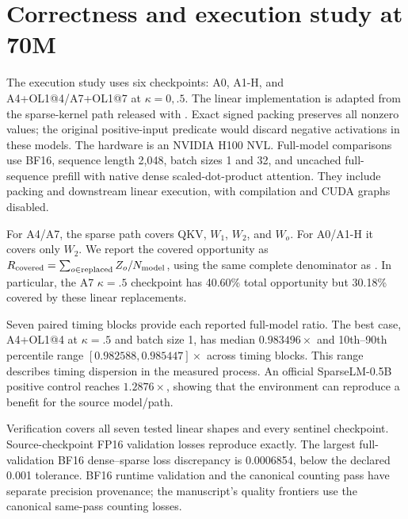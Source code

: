 \section{Correctness and execution study at 70M}
\label{app:runtime}
The execution study uses six checkpoints: A0, A1-H, and
A4+OL1@4/A7+OL1@7 at $\kappa=0,.5$.
The linear implementation is adapted from the sparse-kernel path released
with \citet{cetin2026sparser}. Exact signed packing preserves all nonzero
values; the original positive-input predicate would discard negative
activations in these models.
The hardware is an NVIDIA H100 NVL. Full-model comparisons use BF16,
sequence length 2,048, batch sizes 1 and 32, and uncached full-sequence
prefill with native dense scaled-dot-product attention.
They include packing and downstream linear execution, with compilation
and CUDA graphs disabled.

For A4/A7, the sparse path covers QKV, $W_1$, $W_2$, and $W_o$.
For A0/A1-H it covers only $W_2$. We report the covered opportunity as
$R_{\rm covered}=\sum_{o\in{\rm replaced}} Z_o/N_{\rm model}$,
using the same complete denominator as \Rmodel.
In particular, the A7 $\kappa=.5$ checkpoint has 40.60\% total opportunity
but 30.18\% covered by these linear replacements.

\begin{table}[h]
\centering
\caption{Complete 70M full-model execution results. Batch columns are
median paired ratios of dense latency to sparse latency; values above one
indicate a speedup. $R_{\rm covered}$ credits only the replaced linear
operations. All six sparse paths are slower at both batch sizes.}
\label{tab:runtime}
\small

\end{table}

Seven paired timing blocks provide each reported full-model ratio.
The best case, A4+OL1@4 at $\kappa=.5$ and batch size 1, has median
$0.983496\times$ and 10th--90th percentile range
$[0.982588,0.985447]\times$ across timing blocks.
This range describes timing dispersion in the measured process.
An official SparseLM-0.5B positive control reaches $1.2876\times$,
showing that the environment can reproduce a benefit for the source
model/path.

Verification covers all seven tested linear shapes and every sentinel
checkpoint. Source-checkpoint FP16 validation losses reproduce exactly.
The largest full-validation BF16 dense--sparse loss discrepancy is
0.0006854, below the declared 0.001 tolerance.
BF16 runtime validation and the canonical counting pass have separate
precision provenance; the manuscript's quality frontiers use the canonical
same-pass counting losses.

